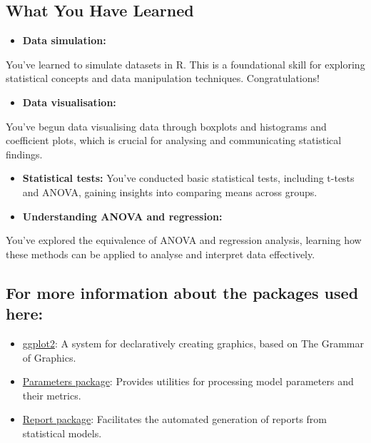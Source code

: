 \documentclass[
  singlecolumn]{article}
\providecommand{\tightlist}{%
  \setlength{\itemsep}{0pt}\setlength{\parskip}{0pt}}\usepackage{longtable,booktabs,array}
\theoremstyle{definition}
\theoremstyle{remark}
\begin{document}
\subsection{What You Have Learned}\label{what-you-have-learned}

\begin{itemize}
\tightlist
\item
  \textbf{Data simulation:}
\end{itemize}

You've learned to simulate datasets in R. This is a foundational skill
for exploring statistical concepts and data manipulation techniques.
Congratulations!

\begin{itemize}
\tightlist
\item
  \textbf{Data visualisation:}
\end{itemize}

You've begun data visualising data through boxplots and histograms and
coefficient plots, which is crucial for analysing and communicating
statistical findings.

\begin{itemize}
\item
  \textbf{Statistical tests:} You've conducted basic statistical tests,
  including t-tests and ANOVA, gaining insights into comparing means
  across groups.
\item
  \textbf{Understanding ANOVA and regression:}
\end{itemize}

You've explored the equivalence of ANOVA and regression analysis,
learning how these methods can be applied to analyse and interpret data
effectively.

\subsection{For more information about the packages used
here:}\label{for-more-information-about-the-packages-used-here}

\begin{itemize}
\item
  \href{https://ggplot2.tidyverse.org/}{ggplot2}: A system for
  declaratively creating graphics, based on The Grammar of Graphics.
\item
  \href{https://easystats.github.io/parameters/}{Parameters package}:
  Provides utilities for processing model parameters and their metrics.
\item
  \href{https://easystats.github.io/report/index.html}{Report package}:
  Facilitates the automated generation of reports from statistical
  models.
\end{itemize}
\end{document}
